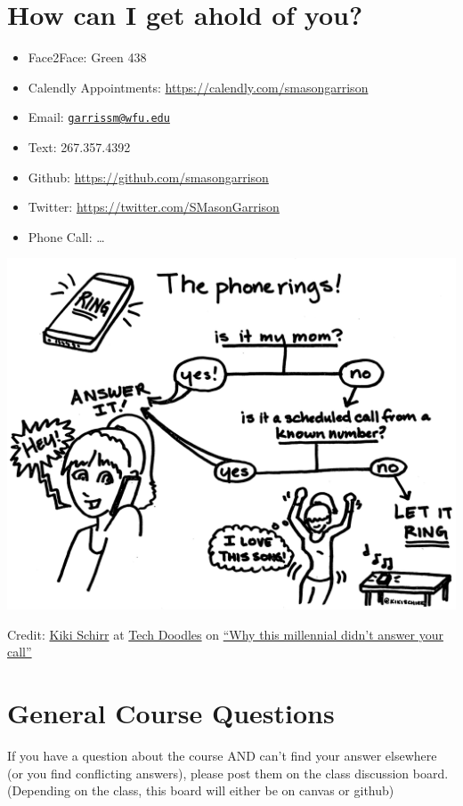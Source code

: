 \hypertarget{how-can-i-get-ahold-of-you}{%
\section{How can I get ahold of you?}\label{how-can-i-get-ahold-of-you}}

\begin{itemize}
\item
  Face2Face: Green 438
\item
  Calendly Appointments: \url{https://calendly.com/smasongarrison}
\item
  Email: \href{mailto:garrissm@wfu.edu}{\nolinkurl{garrissm@wfu.edu}}
\item
  Text: 267.357.4392
\item
  Github: \url{https://github.com/smasongarrison}
\item
  Twitter: \url{https://twitter.com/SMasonGarrison}
\item
  Phone Call: \ldots{}
\end{itemize}

\begin{center}\includegraphics[width=0.5\linewidth]{img/why-this-millennial-didnt-answer-your-call} \end{center}

Credit: \href{https://kikischirr.medium.com/}{Kiki Schirr} at \href{https://medium.com/tech-doodles}{Tech Doodles} on \href{https://medium.com/tech-doodles/why-this-millennial-didnt-answer-your-call-d5abccf06cfc}{``Why this millennial didn't answer your call''}

\hypertarget{general-course-questions}{%
\section{General Course Questions}\label{general-course-questions}}

If you have a question about the course AND can't find your answer elsewhere (or you find conflicting answers), please post them on the class discussion board. (Depending on the class, this board will either be on canvas or github)

